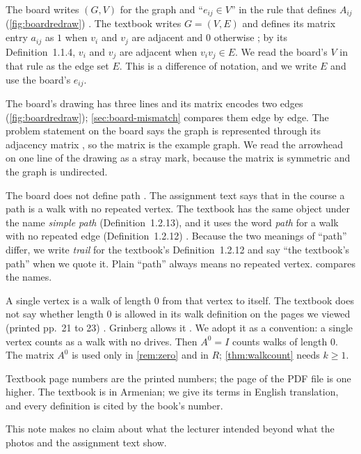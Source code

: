 \begin{convention}\label{conv:edgeset}
The board writes $(G,V)$ for the graph and ``$e_{ij}\in V$'' in the rule
that defines $A_{ij}$ (\cref{fig:boardredraw}) \cite{whiteboard1,whiteboard2}. The
textbook writes $G=(V,E)$ \cite[p.~9]{petrosyan2015graph} and defines its matrix
entry $a_{ij}$ as $1$ when $v_i$ and $v_j$ are adjacent and $0$ otherwise
\cite[p.~11]{petrosyan2015graph}; by its Definition~1.1.4, $v_i$ and $v_j$ are
adjacent when $v_iv_j\in E$. We read the board's $V$ in that rule as the edge set
$E$. This is a difference of notation, and we write $E$ and use the board's
$e_{ij}$.
\end{convention}

\begin{convention}\label{conv:matrix}
The board's drawing has three lines and its matrix encodes two edges
(\cref{fig:boardredraw}); \cref{sec:board-mismatch} compares them edge by edge. The problem statement on the board says the graph
is represented through its adjacency matrix \cite{whiteboard1}, so the matrix is
the example graph. We read the arrowhead on one line of the drawing as a stray
mark, because the matrix is symmetric and the graph is undirected.
\end{convention}

\begin{convention}\label{conv:path}
The board does not define path \cite{whiteboard1}. The assignment text says
that in the course a path is a walk with no repeated vertex. The textbook has
the same object under the name \emph{simple path} (Definition~1.2.13), and
it uses the word \emph{path} for a walk with no repeated edge
(Definition~1.2.12) \cite[p.~22]{petrosyan2015graph}. Because the two meanings
of ``path'' differ, we write \emph{trail} for the textbook's Definition~1.2.12
and say ``the textbook's path'' when we quote it. Plain ``path'' always means
no repeated vertex.  compares the names.
\end{convention}

\begin{convention}\label{conv:zero}
A single vertex is a walk of length $0$ from that vertex to itself. The
textbook does not say whether length $0$ is allowed in its walk definition on
the pages we viewed (printed pp.~21 to 23) \cite{petrosyan2015graph}. Grinberg
allows it \cite[p.~36, Definition~2.9.1(a)]{grinberg2025graph}. We adopt it as a
convention: a single vertex counts as a walk with no drives. Then $A^0=I$ counts
walks of length $0$. The matrix $A^0$ is used only in \cref{rem:zero} and in $R$;
\cref{thm:walkcount} needs $k\ge1$.
\end{convention}

\begin{convention}\label{conv:pages}
Textbook page numbers are the printed numbers; the page of the PDF file is one
higher. The textbook is in Armenian; we give its terms in English translation, and
every definition is cited by the book's number.
\end{convention}

This note makes no claim about what the lecturer intended beyond what the
photos and the assignment text show.
